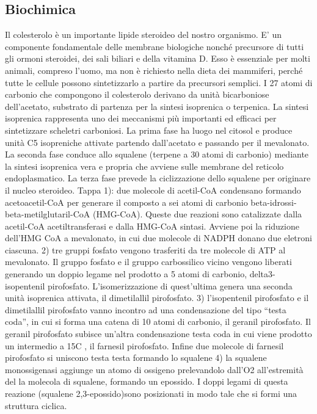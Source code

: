 \documentclass[a4paper, 12pt]{article}
\begin{document}
\begin{titlepage}
\section{Biochimica}
Il colesterolo è un importante lipide steroideo del nostro organismo. E’ un componente fondamentale delle membrane biologiche nonché precursore di tutti gli ormoni steroidei, dei sali biliari e della vitamina D. Esso è essenziale per molti animali, compreso l’uomo, ma non è richiesto nella dieta dei mammiferi, perché tutte le cellule possono sintetizzarlo a partire da precursori semplici. I 27 atomi di carbonio che compongono il colesterolo derivano da unità bicarboniose dell’acetato, substrato di partenza per la sintesi isoprenica  o terpenica.
La sintesi isoprenica rappresenta uno dei meccanismi più importanti ed efficaci per sintetizzare scheletri carboniosi. La prima fase ha luogo nel citosol e produce unità C5 isopreniche attivate partendo dall’acetato e  passando per il mevalonato. La seconda fase conduce allo squalene (terpene a 30 atomi di carbonio) mediante la sintesi isoprenica vera e propria che avviene sulle membrane del reticolo endoplasmatico. La terza fase prevede la ciclizzazione dello squalene per originare il nucleo steroideo.
Tappa 1): due molecole di acetil-CoA condensano formando acetoacetil-CoA per generare il composto a sei atomi di carbonio beta-idrossi-beta-metilglutaril-CoA (HMG-CoA). Queste due reazioni sono catalizzate dalla acetil-CoA acetiltransferasi e dalla HMG-CoA sintasi. Avviene poi la riduzione dell’HMG CoA a mevalonato, in cui due molecole di NADPH donano due eletroni ciascuna.
2) tre gruppi fosfato vengono trasferiti da tre molecole di ATP al mevalonato. Il gruppo fosfato  e il gruppo carbossilico vicino vengono liberati generando un doppio legame nel prodotto a 5 atomi di carbonio, delta3-isopentenil pirofosfato. L’isomerizzazione di quest’ultima genera una seconda unità isoprenica attivata, il dimetilallil pirofosfato.
3) l’isopentenil pirofosfato e il dimetilallil pirofosfato vanno incontro ad una condensazione del tipo “testa coda”, in cui si forma una catena di 10 atomi di carbonio, il geranil pirofosfato. Il geranil pirofosfato subisce un’altra condensazione testa coda in cui viene prodotto un intermedio  a 15C , il farnesil pirofosfato. Infine due molecole di farnesil pirofosfato si uniscono testa testa formando lo squalene
4) la squalene monossigenasi aggiunge un atomo di ossigeno prelevandolo dall’O2 all’estremità del la molecola di squalene, formando un epossido. I doppi legami di questa reazione (squalene 2,3-epossido)sono posizionati in modo tale che si formi una struttura ciclica.


\end{titlepage}
\end{document}
